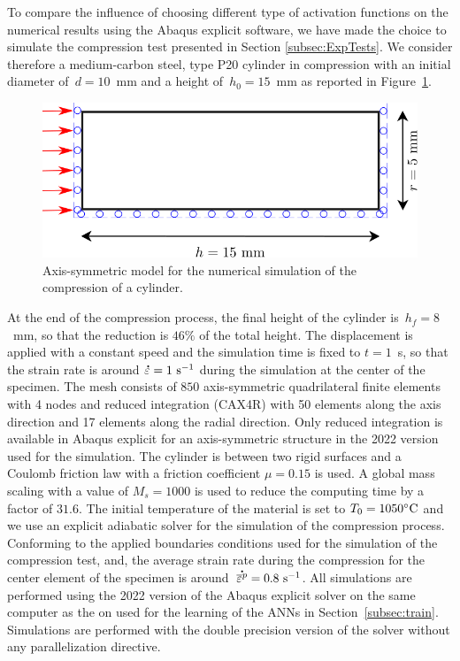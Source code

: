 \documentclass[algorithms,article,submit,pdftex,oneauthors]{Definitions/mdpi}
\DeclareRobustCommand{\mdot}[1]{\accentset{\mbox{\bfseries .}}{#1}}
\DeclareRobustCommand{\ps}{\text{s}^{-1}}
\DeclareRobustCommand{\GPa}{\text{GPa}}
\begin{document}
To compare the influence of choosing different type of activation functions on the numerical results using the Abaqus explicit software, we have made the choice to simulate the compression test presented in Section \ref{subsec:ExpTests}.
We consider therefore a medium-carbon steel, type P20 cylinder in compression with an initial diameter of~$d=10$~mm and a height of~$h_0=15$~mm as reported in Figure~\ref{fig:Num-model}.
\begin{figure}[h!]
\centering
\includegraphics[width=0.65\columnwidth]{Figures/CyCompression}
\caption{Axis-symmetric model for the numerical simulation of the compression of a cylinder.}
\label{fig:Num-model}
\end{figure}
At the end of the compression process, the final height of the cylinder is~$h_f=8$~mm, so that the reduction is $46\%$ of the total height. 
The displacement is applied with a constant speed and the simulation time is fixed to $t=1$~s, so that the strain rate is around $\mdot{\varepsilon}=1~\ps$ during the simulation at the center of the specimen.
The mesh consists of $850$ axis-symmetric quadrilateral finite elements with 4 nodes and reduced integration (CAX4R) with 50 elements along the axis direction and 17 elements along the radial direction.
Only reduced integration is available in Abaqus explicit for an axis-symmetric structure in the 2022 version used for the simulation.
The cylinder is between two rigid surfaces and a Coulomb friction law with a friction coefficient $\mu=0.15$ is used.
A global mass scaling with a value of $M_s=1000$ is used to reduce the computing time by a factor of $31.6$.
The initial temperature of the material is set to $T_0=1050\celsius$ and we use an explicit adiabatic solver for the simulation of the compression process. 
Conforming to the applied boundaries conditions used for the simulation of the compression test, and, the average strain rate during the compression for the center element of the specimen is around~$\mdot{\overline{\varepsilon}^p}=0.8~\ps$.
All simulations are performed using the 2022 version of the Abaqus explicit solver on the same computer as the on used for the learning of the ANNs in Section~\ref{subsec:train}. Simulations are performed with the double precision version of the solver without any parallelization directive.
\end{document}
